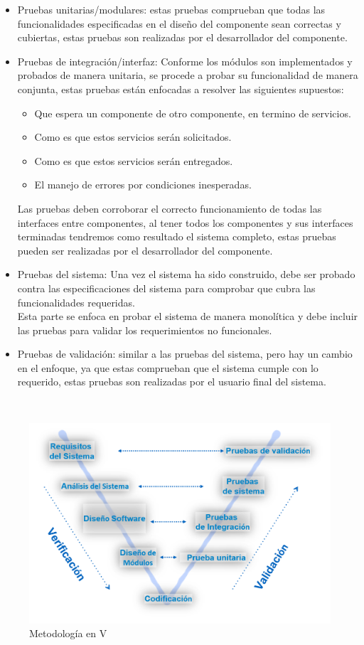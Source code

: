 \begin{itemize}

    \item Pruebas unitarias/modulares: estas pruebas comprueban que todas las funcionalidades especificadas en el diseño del componente sean correctas y cubiertas, estas pruebas son realizadas por el desarrollador del componente.
    
    \item Pruebas de integración/interfaz:
    Conforme los módulos son implementados y probados de manera unitaria, se procede a probar su funcionalidad de manera conjunta, estas pruebas están enfocadas a resolver las siguientes supuestos:
    
    \begin{itemize}
        \item Que espera un componente de otro componente, en termino de servicios.
        \item Como es que estos servicios serán solicitados.
        \item Como es que estos servicios serán entregados.
        \item El manejo de errores por condiciones inesperadas.
    \end{itemize}
    
    Las pruebas deben corroborar el correcto funcionamiento de todas las interfaces entre componentes, al tener todos los componentes y sus interfaces terminadas tendremos como resultado el sistema completo, estas pruebas pueden ser realizadas por el desarrollador del componente.
    
    \item Pruebas del sistema: Una vez el sistema ha sido construido, debe ser probado contra las especificaciones del sistema para comprobar que cubra las funcionalidades requeridas.\\
    Esta parte se enfoca en probar el sistema de manera monolítica y debe incluir las pruebas para validar los requerimientos no funcionales.

    \item Pruebas de validación: similar a las pruebas del sistema, pero hay un cambio en el enfoque, ya que estas comprueban que el sistema cumple con lo requerido, estas pruebas son realizadas por el usuario final del sistema.

\end{itemize}

\\
\begin{figure}[H]
	\centering
	\includegraphics[scale=.5]{Capitulo3/img/vmodel.png}
	\caption{Metodología en V}
	\label{fig:ModeloIncremental}
\end{figure}

